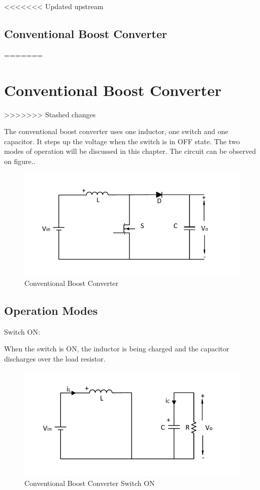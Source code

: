 <<<<<<< Updated upstream
\section{Conventional Boost Converter}\label{ch:CBC}
=======
\chapter{Conventional Boost Converter}\label{ch:CBC}
>>>>>>> Stashed changes

The conventional boost converter uses one inductor,
one switch and one capacitor. It steps up the voltage when
the switch is in OFF state. The two modes of operation will be discussed in this chapter. The circuit can be observed on figure..


\begin{figure}[H]
   \centering
   \includegraphics[width=\textwidth]{figures/aConventionalBoost/ConventionalBoostConverter.pdf}
    \caption{Conventional Boost Converter}
	\label{fig:ConventionalBoost}
\end{figure}

\section{Operation Modes}\label{sec:SON}

Switch ON:

When the switch is ON,
the inductor is being charged and the capacitor discharges over the load resistor.

\begin{figure}[H]
   \centering
   \includegraphics[width=\textwidth]{figures/aConventionalBoost/ConventionalBoostConverterON.pdf}
    \caption{Conventional Boost Converter Switch ON}
	\label{fig:ConventionalBoostONN}
\end{figure}

